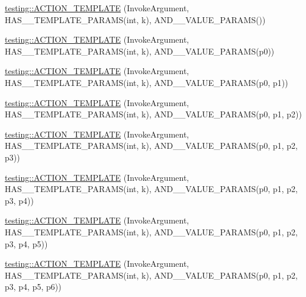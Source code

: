 \begin{DoxyCompactItemize}
\item 
\mbox{\hyperlink{namespacetesting_a8a02397c7fdf8e84d559ab72dcc28eb1}{testing\+::\+A\+C\+T\+I\+O\+N\+\_\+\+T\+E\+M\+P\+L\+A\+TE}} (Invoke\+Argument, H\+A\+S\+\_\+\_\+\+T\+E\+M\+P\+L\+A\+T\+E\+\_\+\+P\+A\+R\+A\+MS(int, k), A\+N\+D\+\_\+\_\+\+V\+A\+L\+U\+E\+\_\+\+P\+A\+R\+A\+MS())
\item 
\mbox{\hyperlink{namespacetesting_afaa0d88f5442f9aee5d6147377d3e50c}{testing\+::\+A\+C\+T\+I\+O\+N\+\_\+\+T\+E\+M\+P\+L\+A\+TE}} (Invoke\+Argument, H\+A\+S\+\_\+\_\+\+T\+E\+M\+P\+L\+A\+T\+E\+\_\+\+P\+A\+R\+A\+MS(int, k), A\+N\+D\+\_\+\_\+\+V\+A\+L\+U\+E\+\_\+\+P\+A\+R\+A\+MS(p0))
\item 
\mbox{\hyperlink{namespacetesting_a39bf6c49dc1323cc9539a12249e60aba}{testing\+::\+A\+C\+T\+I\+O\+N\+\_\+\+T\+E\+M\+P\+L\+A\+TE}} (Invoke\+Argument, H\+A\+S\+\_\+\_\+\+T\+E\+M\+P\+L\+A\+T\+E\+\_\+\+P\+A\+R\+A\+MS(int, k), A\+N\+D\+\_\+\_\+\+V\+A\+L\+U\+E\+\_\+\+P\+A\+R\+A\+MS(p0, p1))
\item 
\mbox{\hyperlink{namespacetesting_ac50647216fdf5197899a3d5034a9a670}{testing\+::\+A\+C\+T\+I\+O\+N\+\_\+\+T\+E\+M\+P\+L\+A\+TE}} (Invoke\+Argument, H\+A\+S\+\_\+\_\+\+T\+E\+M\+P\+L\+A\+T\+E\+\_\+\+P\+A\+R\+A\+MS(int, k), A\+N\+D\+\_\+\_\+\+V\+A\+L\+U\+E\+\_\+\+P\+A\+R\+A\+MS(p0, p1, p2))
\item 
\mbox{\hyperlink{namespacetesting_ae98e43eecf8f44990b39b460f00b397b}{testing\+::\+A\+C\+T\+I\+O\+N\+\_\+\+T\+E\+M\+P\+L\+A\+TE}} (Invoke\+Argument, H\+A\+S\+\_\+\_\+\+T\+E\+M\+P\+L\+A\+T\+E\+\_\+\+P\+A\+R\+A\+MS(int, k), A\+N\+D\+\_\+\_\+\+V\+A\+L\+U\+E\+\_\+\+P\+A\+R\+A\+MS(p0, p1, p2, p3))
\item 
\mbox{\hyperlink{namespacetesting_a505f6d82df233802c5f4235d77dca164}{testing\+::\+A\+C\+T\+I\+O\+N\+\_\+\+T\+E\+M\+P\+L\+A\+TE}} (Invoke\+Argument, H\+A\+S\+\_\+\_\+\+T\+E\+M\+P\+L\+A\+T\+E\+\_\+\+P\+A\+R\+A\+MS(int, k), A\+N\+D\+\_\+\_\+\+V\+A\+L\+U\+E\+\_\+\+P\+A\+R\+A\+MS(p0, p1, p2, p3, p4))
\item 
\mbox{\hyperlink{namespacetesting_ab85e5f54a209bf141fc04f8612fbe887}{testing\+::\+A\+C\+T\+I\+O\+N\+\_\+\+T\+E\+M\+P\+L\+A\+TE}} (Invoke\+Argument, H\+A\+S\+\_\+\_\+\+T\+E\+M\+P\+L\+A\+T\+E\+\_\+\+P\+A\+R\+A\+MS(int, k), A\+N\+D\+\_\+\_\+\+V\+A\+L\+U\+E\+\_\+\+P\+A\+R\+A\+MS(p0, p1, p2, p3, p4, p5))
\item 
\mbox{\hyperlink{namespacetesting_a8d3590561f334d165c620f522219831b}{testing\+::\+A\+C\+T\+I\+O\+N\+\_\+\+T\+E\+M\+P\+L\+A\+TE}} (Invoke\+Argument, H\+A\+S\+\_\+\_\+\+T\+E\+M\+P\+L\+A\+T\+E\+\_\+\+P\+A\+R\+A\+MS(int, k), A\+N\+D\+\_\+\_\+\+V\+A\+L\+U\+E\+\_\+\+P\+A\+R\+A\+MS(p0, p1, p2, p3, p4, p5, p6))

\end{DoxyCompactItemize}
